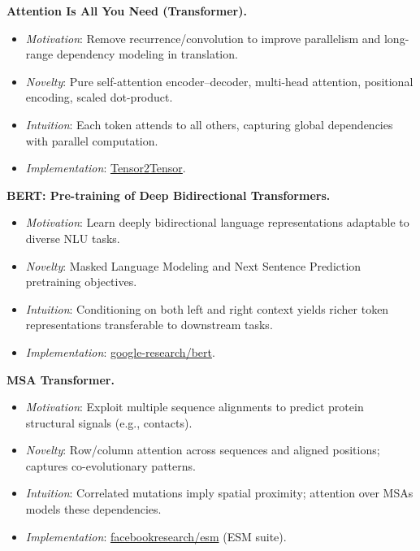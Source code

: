 \documentclass{article}
\begin{document}
\textbf{Attention Is All You Need (Transformer).}
\begin{itemize}[leftmargin=*]
    \item \emph{Motivation}: Remove recurrence/convolution to improve parallelism and long-range dependency modeling in translation.
    \item \emph{Novelty}: Pure self-attention encoder–decoder, multi-head attention, positional encoding, scaled dot-product.
    \item \emph{Intuition}: Each token attends to all others, capturing global dependencies with parallel computation.
    \item \emph{Implementation}: \href{https://github.com/tensorflow/tensor2tensor}{Tensor2Tensor}.
\end{itemize}

\textbf{BERT: Pre-training of Deep Bidirectional Transformers.}
\begin{itemize}[leftmargin=*]
    \item \emph{Motivation}: Learn deeply bidirectional language representations adaptable to diverse NLU tasks.
    \item \emph{Novelty}: Masked Language Modeling and Next Sentence Prediction pretraining objectives.
    \item \emph{Intuition}: Conditioning on both left and right context yields richer token representations transferable to downstream tasks.
    \item \emph{Implementation}: \href{https://github.com/google-research/bert}{google-research/bert}.
\end{itemize}

\textbf{MSA Transformer.}
\begin{itemize}[leftmargin=*]
    \item \emph{Motivation}: Exploit multiple sequence alignments to predict protein structural signals (e.g., contacts).
    \item \emph{Novelty}: Row/column attention across sequences and aligned positions; captures co-evolutionary patterns.
    \item \emph{Intuition}: Correlated mutations imply spatial proximity; attention over MSAs models these dependencies.
    \item \emph{Implementation}: \href{https://github.com/facebookresearch/esm}{facebookresearch/esm} (ESM suite).
\end{itemize}
\end{document}
